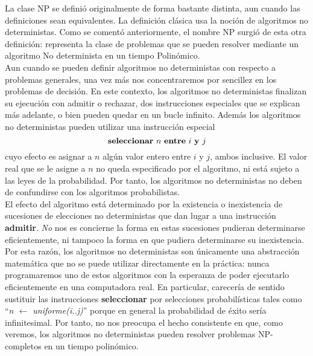 La clase NP se definió originalmente de forma bastante distinta, aun cuando las definiciones sean equivalentes. La definición clásica usa la noción de algoritmos no deterministas. Como se comentó anteriormente, el nombre NP surgió de esta otra definición: representa la clase de problemas que se pueden resolver mediante un algoritmo No determinista en un tiempo Polinómico.\\
Aun cuando se pueden definir algoritmos no deterministas con respecto a problemas generales, una vez más nos concentraremos por sencillez en los problemas de decisión. En este contexto, los algoritmos no deterministas finalizan su ejecución con admitir o rechazar, dos instrucciones especiales que se explican más adelante, o bien pueden quedar en un bucle infinito. Además los algoritmos no deterministas pueden utilizar una instrucción especial
\[ \mbox{\textbf{seleccionar}}\ n\ \mbox{\textbf{entre}}\ i\ \mbox{\textbf{y}}\ j \]
cuyo efecto es asignar a $n$ algún valor entero entre $i$ y $j$, ambos inclusive. El valor real que se le asigne a $n$ no queda especificado por el algoritmo, ni está sujeto a las leyes de la probabilidad. Por tanto, los algoritmos no deterministas no deben de confundirse con los algoritmos probabilistas.\\
El efecto del algoritmo está determinado por la existencia o inexistencia de sucesiones de elecciones no deterministas que dan lugar a una instrucción \textbf{admitir}. \emph{No} nos es concierne la forma en estas sucesiones pudieran determinarse eficientemente, ni tampoco la forma en que pudiera determinarse su inexistencia. Por esta razón, los algoritmos no deterministas son únicamente una abstracción matemática que no se puede utilizar directamente en la práctica: nunca programaremos uno de estos algoritmos con la esperanza de poder ejecutarlo eficientemente en una computadora real. En particular, carecería de sentido sustituir las instrucciones \textbf{seleccionar} por selecciones probabilísticas tales como ``\emph{n $\leftarrow$ uniforme(i..j)}'' porque en general la probabilidad de éxito sería infinitesimal. Por tanto, no nos preocupa el hecho consistente en que, como veremos, los algoritmos no deterministas pueden resolver problemas NP-completos en un tiempo polinómico.

